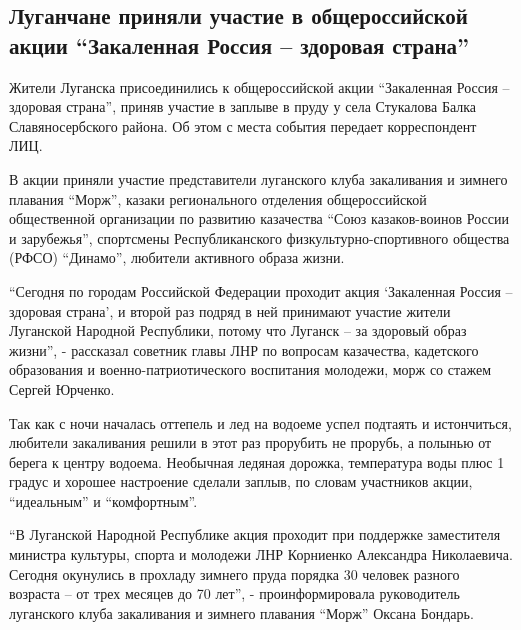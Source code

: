  
 
 
 
 
\subsection{Луганчане приняли участие в общероссийской акции \enquote{Закаленная Россия – здоровая страна}}
\label{sec:25_12_2021.stz.news.lnr.lug_info.1.zakalennaja_rossia}

Жители Луганска присоединились к общероссийской акции \enquote{Закаленная Россия –
здоровая страна}, приняв участие в заплыве в пруду у села Стукалова Балка
Славяносербского района. Об этом с места события передает корреспондент ЛИЦ.


В акции приняли участие представители луганского клуба закаливания и зимнего
плавания \enquote{Морж}, казаки регионального отделения общероссийской общественной
организации по развитию казачества \enquote{Союз казаков-воинов России и зарубежья},
спортсмены Республиканского физкультурно-спортивного общества (РФСО) \enquote{Динамо},
любители активного образа жизни.

\enquote{Сегодня по городам Российской Федерации проходит акция
\enquote{Закаленная Россия – здоровая страна}, и второй раз подряд в ней
принимают участие жители Луганской Народной Республики, потому что Луганск – за
здоровый образ жизни}, - рассказал советник главы ЛНР по вопросам казачества,
кадетского образования и военно-патриотического воспитания молодежи, морж со
стажем Сергей Юрченко.

Так как с ночи началась оттепель и лед на водоеме успел подтаять и истончиться,
любители закаливания решили в этот раз прорубить не прорубь, а полынью от
берега к центру водоема. Необычная ледяная дорожка, температура воды плюс 1
градус и хорошее настроение сделали заплыв, по словам участников акции,
\enquote{идеальным} и \enquote{комфортным}.

\enquote{В Луганской Народной Республике акция проходит при поддержке заместителя
министра культуры, спорта и молодежи ЛНР Корниенко Александра Николаевича.
Сегодня окунулись в прохладу зимнего пруда порядка 30 человек разного возраста
– от трех месяцев до 70 лет}, - проинформировала руководитель луганского клуба
закаливания и зимнего плавания \enquote{Морж} Оксана Бондарь.

